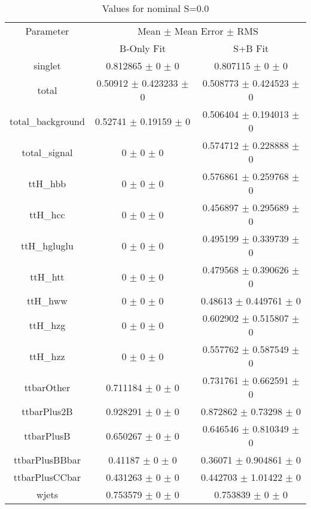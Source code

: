\begin{table}
\centering
\caption{Values for nominal S=0.0}
\begin{tabular}{ccc}
\toprule
Parameter & \multicolumn{2}{c}{Mean $\pm$ Mean Error $\pm$ RMS}\\
 & B-Only Fit & S+B Fit\\
\midrule
singlet & \num{0.812865} $\pm$ \num{0} $\pm$ \num{0} & \num{0.807115} $\pm$ \num{0} $\pm$ \num{0}\\
total & \num{0.50912} $\pm$ \num{0.423233} $\pm$ \num{0} & \num{0.508773} $\pm$ \num{0.424523} $\pm$ \num{0}\\
total\_background & \num{0.52741} $\pm$ \num{0.19159} $\pm$ \num{0} & \num{0.506404} $\pm$ \num{0.194013} $\pm$ \num{0}\\
total\_signal & \num{0} $\pm$ \num{0} $\pm$ \num{0} & \num{0.574712} $\pm$ \num{0.228888} $\pm$ \num{0}\\
ttH\_hbb & \num{0} $\pm$ \num{0} $\pm$ \num{0} & \num{0.576861} $\pm$ \num{0.259768} $\pm$ \num{0}\\
ttH\_hcc & \num{0} $\pm$ \num{0} $\pm$ \num{0} & \num{0.456897} $\pm$ \num{0.295689} $\pm$ \num{0}\\
ttH\_hgluglu & \num{0} $\pm$ \num{0} $\pm$ \num{0} & \num{0.495199} $\pm$ \num{0.339739} $\pm$ \num{0}\\
ttH\_htt & \num{0} $\pm$ \num{0} $\pm$ \num{0} & \num{0.479568} $\pm$ \num{0.390626} $\pm$ \num{0}\\
ttH\_hww & \num{0} $\pm$ \num{0} $\pm$ \num{0} & \num{0.48613} $\pm$ \num{0.449761} $\pm$ \num{0}\\
ttH\_hzg & \num{0} $\pm$ \num{0} $\pm$ \num{0} & \num{0.602902} $\pm$ \num{0.515807} $\pm$ \num{0}\\
ttH\_hzz & \num{0} $\pm$ \num{0} $\pm$ \num{0} & \num{0.557762} $\pm$ \num{0.587549} $\pm$ \num{0}\\
ttbarOther & \num{0.711184} $\pm$ \num{0} $\pm$ \num{0} & \num{0.731761} $\pm$ \num{0.662591} $\pm$ \num{0}\\
ttbarPlus2B & \num{0.928291} $\pm$ \num{0} $\pm$ \num{0} & \num{0.872862} $\pm$ \num{0.73298} $\pm$ \num{0}\\
ttbarPlusB & \num{0.650267} $\pm$ \num{0} $\pm$ \num{0} & \num{0.646546} $\pm$ \num{0.810349} $\pm$ \num{0}\\
ttbarPlusBBbar & \num{0.41187} $\pm$ \num{0} $\pm$ \num{0} & \num{0.36071} $\pm$ \num{0.904861} $\pm$ \num{0}\\
ttbarPlusCCbar & \num{0.431263} $\pm$ \num{0} $\pm$ \num{0} & \num{0.442703} $\pm$ \num{1.01422} $\pm$ \num{0}\\
wjets & \num{0.753579} $\pm$ \num{0} $\pm$ \num{0} & \num{0.753839} $\pm$ \num{0} $\pm$ \num{0}\\
\bottomrule
\end{tabular}
\end{table}